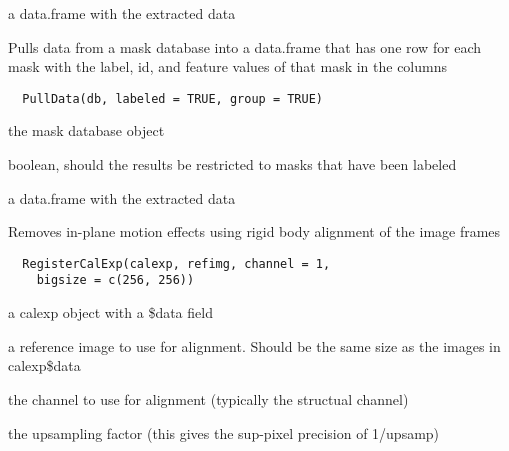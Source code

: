 \documentclass[a4paper]{book}
\begin{document}
%
\begin{Value}
a data.frame with the extracted data
\end{Value}
%
\begin{Description}\relax
Pulls data from a mask database into a data.frame that
has one row for each mask with the label, id, and feature
values of that mask in the columns
\end{Description}
%
\begin{Usage}
\begin{verbatim}
  PullData(db, labeled = TRUE, group = TRUE)
\end{verbatim}
\end{Usage}
%
\begin{Arguments}
\begin{ldescription}
\item[\code{db}] the mask database object

\item[\code{labeled}] boolean, should the results be restricted
to masks that have been labeled
\end{ldescription}
\end{Arguments}
%
\begin{Value}
a data.frame with the extracted data
\end{Value}
%
\begin{Description}\relax
Removes in-plane motion effects using rigid body
alignment of the image frames
\end{Description}
%
\begin{Usage}
\begin{verbatim}
  RegisterCalExp(calexp, refimg, channel = 1,
    bigsize = c(256, 256))
\end{verbatim}
\end{Usage}
%
\begin{Arguments}
\begin{ldescription}
\item[\code{calexp}] a calexp object with a \bsl{}\$data field

\item[\code{refimg}] a reference image to use for alignment.
Should be the same size as the images in calexp\bsl{}\$data

\item[\code{channel}] the channel to use for alignment
(typically the structual channel)

\item[\code{upsamp}] the upsampling factor (this gives the
sup-pixel precision of 1/upsamp)
\end{ldescription}
\end{Arguments}
\end{document}
